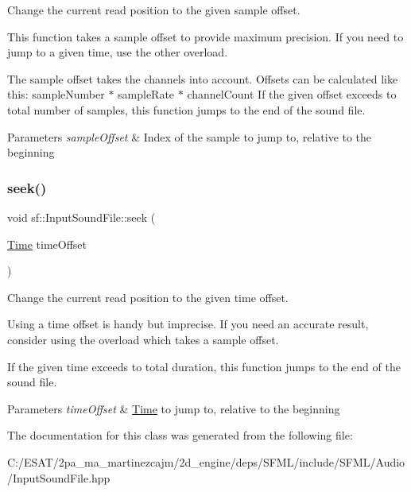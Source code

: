 Change the current read position to the given sample offset. 

This function takes a sample offset to provide maximum precision. If you need to jump to a given time, use the other overload.

The sample offset takes the channels into account. Offsets can be calculated like this\+: {\ttfamily sample\+Number $\ast$ sample\+Rate $\ast$ channel\+Count} If the given offset exceeds to total number of samples, this function jumps to the end of the sound file.


\begin{DoxyParams}{Parameters}
{\em sample\+Offset} & Index of the sample to jump to, relative to the beginning \\
\hline
\end{DoxyParams}
\mbox{\label{classsf_1_1_input_sound_file_a8eee7af58ad75ddc61f93ad72e2d66c1}} 
\subsubsection{\texorpdfstring{seek()}{seek()}\hspace{0.1cm}{\footnotesize\ttfamily [2/2]}}
{\footnotesize\ttfamily void sf\+::\+Input\+Sound\+File\+::seek (\begin{DoxyParamCaption}\item[{\hyperlink{classsf_1_1_time}{Time}}]{time\+Offset }\end{DoxyParamCaption})}



Change the current read position to the given time offset. 

Using a time offset is handy but imprecise. If you need an accurate result, consider using the overload which takes a sample offset.

If the given time exceeds to total duration, this function jumps to the end of the sound file.


\begin{DoxyParams}{Parameters}
{\em time\+Offset} & \hyperlink{classsf_1_1_time}{Time} to jump to, relative to the beginning \\
\hline
\end{DoxyParams}


The documentation for this class was generated from the following file\+:\begin{DoxyCompactItemize}
\item 
C\+:/\+E\+S\+A\+T/2pa\+\_\+ma\+\_\+martinezcajm/2d\+\_\+engine/deps/\+S\+F\+M\+L/include/\+S\+F\+M\+L/\+Audio/Input\+Sound\+File.\+hpp\end{DoxyCompactItemize}
